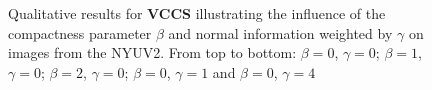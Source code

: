 \begin{figure}
{	}
	\caption[Qualitative results for \textbf{VCCS} \cite{PaponAbramovSchoelerWoergoetter:2013} illustrating the influence of the compactness parameter $\beta$ and normal information on images from the NYU Depth Dataset \cite{SilbermanHoiemKohliFergus:2012}.]{Qualitative results for \textbf{VCCS} \cite{PaponAbramovSchoelerWoergoetter:2013} illustrating the influence of the compactness parameter $\beta$ and normal information weighted by $\gamma$ on images from the NYUV2. From top to bottom: $\beta = 0$, $\gamma = 0$; $\beta = 1$, $\gamma = 0$; $\beta = 2$, $\gamma = 0$; $\beta = 0$, $\gamma = 1$ and $\beta = 0$, $\gamma = 4$}
\end{figure}

